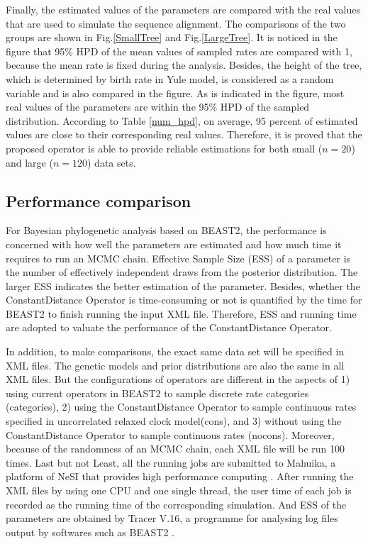 \documentclass{bmcart}
\begin{document}
Finally, the estimated values of the parameters are compared with the real values that are used to simulate the sequence alignment. The comparisons of the two groups are shown in Fig.\ref{SmallTree} and Fig.\ref{LargeTree}. It is noticed in the figure that 95\% HPD of the mean values of sampled rates are compared with 1, because the mean rate is fixed during the analysis. Besides, the height of the tree, which is determined by birth rate in Yule model, is considered as a random variable and is also compared in the figure. As is indicated in the figure, most real values of the parameters are within the 95\% HPD of the sampled distribution. According to Table \ref{num_hpd}, on average, 95 percent of estimated values are close to their corresponding real values. Therefore, it is proved that the proposed operator is able to provide reliable estimations for both small ($n=20$) and large ($n=120$) data sets.
\subsection*{Performance comparison}
For Bayesian phylogenetic analysis based on BEAST2, the performance is concerned with how well the parameters are estimated and how much time it requires to run an MCMC chain. Effective Sample Size (ESS) of a parameter is the number of effectively independent draws from the posterior distribution. The larger ESS indicates the better estimation of the parameter.  Besides, whether the ConstantDistance Operator is time-consuming or not is quantified by the time for BEAST2 to finish running the input XML file. Therefore, ESS and running time are adopted to valuate the performance of the ConstantDistance Operator. 

In addition, to make comparisons, the exact same data set will be specified in XML files. The genetic models and prior distributions are also the same in all XML files. But the configurations of operators are different in the aspects of 1) using current operators in BEAST2 to sample discrete rate categories (categories), 2) using the ConstantDistance Operator  to sample continuous rates specified in uncorrelated relaxed clock model(cons), and 3) without using the ConstantDistance Operator to sample continuous rates (nocons). Moreover, because of the randomness of an MCMC chain, each XML file will be run 100 times. Last but not Least, all the running jobs are submitted to Mahuika, a platform of NeSI that provides high performance computing \cite{nesi}.  After running the XML files by using one CPU and one single thread, the user time of each job is recorded as the running time of the corresponding simulation. And ESS of the parameters are obtained by Tracer V.16, a programme for analysing log files output by softwares such as BEAST2 \cite{Tracer}.
\end{document}
